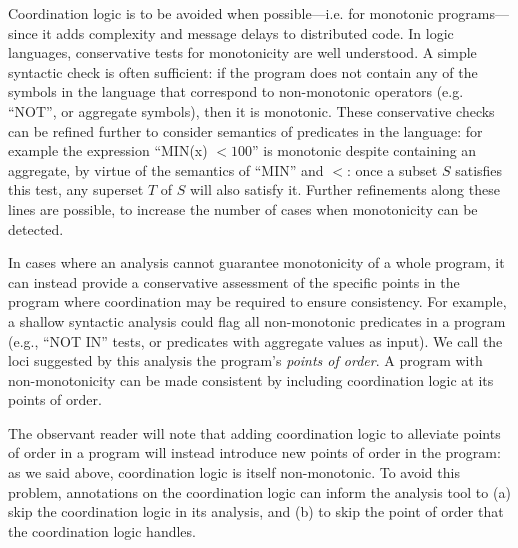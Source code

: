 Coordination logic is to be avoided when possible---i.e. for monotonic programs---since it adds complexity and message delays to distributed code.  In logic languages, conservative tests for monotonicity are well understood. A simple syntactic check is often sufficient: if the program does not contain any of the symbols in the language that correspond to non-monotonic operators (e.g. ``NOT'', or aggregate symbols), then it is monotonic.  These conservative checks can be refined further to consider semantics of predicates in the language: for example the expression ``MIN(x) $< 100$'' is monotonic despite containing an aggregate, by virtue of the semantics of ``MIN'' and $<$: once a subset $S$ satisfies this test, any superset $T$ of $S$ will also satisfy it.  Further refinements along these lines are possible, to increase the number of cases when monotonicity can be detected.
% 

In cases where an analysis cannot guarantee monotonicity of a whole program, it can instead provide a conservative assessment of the specific points in the program where coordination may be required to ensure consistency.  For example, a shallow syntactic analysis could flag all non-monotonic predicates in a program (e.g., ``NOT IN'' tests, or predicates with aggregate values as input).
We call the loci suggested by this analysis the program's \emph{points of
order}. A program with non-monotonicity can be made consistent by including coordination logic at its points of order.  

The observant reader will note that adding coordination logic to alleviate points of order in a program will instead introduce new points of order in the program: as we said above, coordination logic is itself non-monotonic.  To avoid this problem, annotations on the coordination logic can inform the analysis tool to (a) skip the coordination logic in its analysis, and (b) to skip the point of order that the coordination logic handles.  

